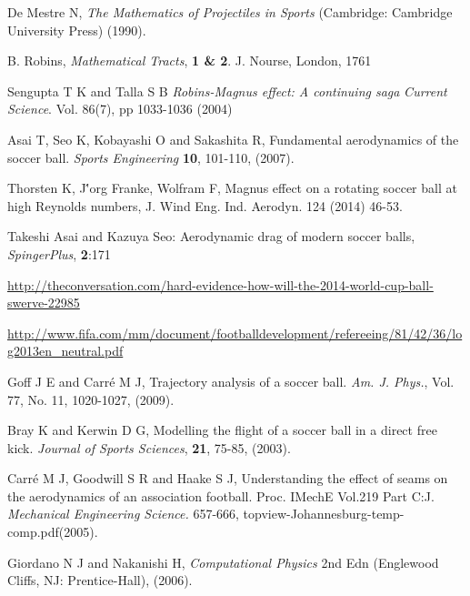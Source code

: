 \documentclass[a4paper]{article}
\begin{document}
\begin{thebibliography}{99}
	De Mestre N, \textit{The Mathematics of Projectiles in Sports} (Cambridge: Cambridge University Press) (1990).
	
	B. Robins, {\it Mathematical Tracts}, {\bf 1 \& 2}. J. Nourse,
	London, 1761	
	
	Sengupta T K and Talla S B \textit{Robins-Magnus effect: A continuing saga} \textit{Current Science}. Vol. 86(7), pp 1033-1036 (2004)
	
	Asai T, Seo K, Kobayashi O and Sakashita R, Fundamental aerodynamics of the soccer ball. \textit{Sports Engineering} \textbf{10}, 101-110, (2007).	
	
Thorsten K, J\''org Franke, Wolfram F, Magnus effect on a rotating soccer ball at high Reynolds numbers, J. Wind Eng. Ind. Aerodyn. 124 (2014) 46-53.	
	
	Takeshi Asai and Kazuya Seo: Aerodynamic drag of modern soccer balls, \textit{SpingerPlus}, \textbf{2}:171	

	\url{http://theconversation.com/hard-evidence-how-will-the-2014-world-cup-ball-swerve-22985}	
	
						                           				\url{http://www.fifa.com/mm/document/footballdevelopment/refereeing/81/42/36/log2013en_neutral.pdf
}	
	
	Goff J E and Carr\'e M J, Trajectory analysis of a soccer ball. \textit{Am. J. Phys.}, Vol. 77, No. 11, 1020-1027, (2009).

	Bray K and Kerwin D G, Modelling the flight of a soccer ball in a direct free kick. \textit{Journal of Sports Sciences}, \textbf{21}, 75-85, (2003).

	Carr\'e M J, Goodwill S R and Haake S J, Understanding the effect of seams on the aerodynamics of an association football. Proc. IMechE Vol.219 Part C:J. \textit{Mechanical Engineering Science. } 657-666, topview-Johannesburg-temp-comp.pdf(2005).
	
	Giordano N J and Nakanishi H, \textit{Computational Physics} 2nd Edn (Englewood Cliffs, NJ: Prentice-Hall), (2006).	


\end{thebibliography}
\end{document}
